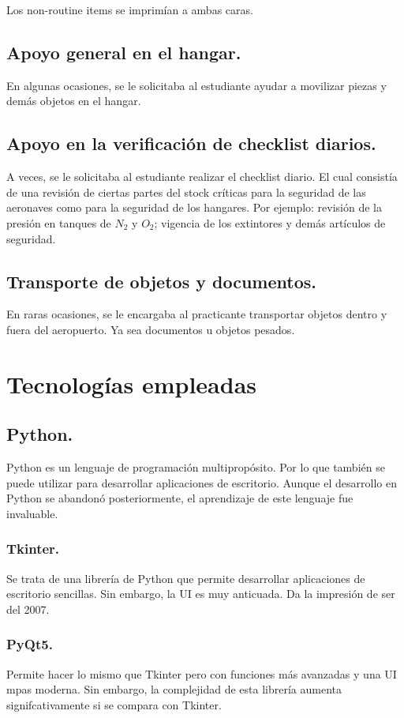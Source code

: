     Los non-routine items se imprimían a ambas caras.
    \subsection{Apoyo general en el hangar.}
    En algunas ocasiones, se le solicitaba al estudiante ayudar a movilizar piezas y demás objetos en el hangar. 
    \subsection{Apoyo en la verificación de checklist diarios.}
    A veces, se le solicitaba al estudiante realizar el checklist diario. El cual consistía de una revisión de ciertas partes del stock críticas para la seguridad de las aeronaves como para la seguridad de los hangares. Por ejemplo: revisión de la presión en tanques de $N_2$ y $O_2$; vigencia de los extintores y demás artículos de seguridad.
    \subsection{Transporte de objetos y documentos.}
    En raras ocasiones, se le encargaba al practicante transportar objetos dentro y fuera del aeropuerto. Ya sea documentos u objetos pesados. 
    

\section{Tecnologías empleadas}
\subsection{Python.}
Python es un lenguaje de programación multipropósito. Por lo que también se puede utilizar para desarrollar aplicaciones de escritorio. Aunque el desarrollo en Python se abandonó posteriormente, el aprendizaje de este lenguaje fue invaluable.
    \subsubsection{Tkinter.}
    Se trata de una librería de Python que permite desarrollar aplicaciones de escritorio sencillas. Sin embargo, la UI es muy anticuada. Da la impresión de ser del 2007.
    \subsubsection{PyQt5.}
    Permite hacer lo mismo que Tkinter pero con funciones más avanzadas y una UI mpas moderna. Sin embargo, la complejidad de esta librería aumenta signifcativamente si se compara con Tkinter. 
